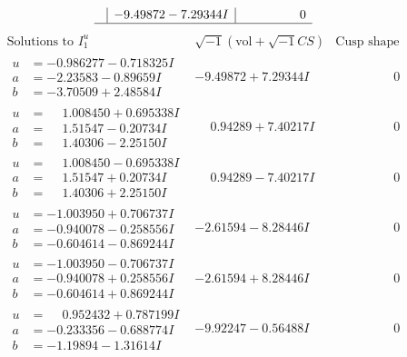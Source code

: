 \documentclass[1p]{elsarticle_modified}
\theoremstyle{definition}
\newcommand{\I}{\sqrt{-1}}
\begin{document}
$$\begin{array}{c|c|c}
 & -9.49872 - 7.29344 I & \phantom{-0.000000 } 0\\
 \hline 
 \end{array}$$\newpage$$\begin{array}{c|c|c}  
\text{Solutions to }I^u_{1}& \I (\text{vol} + \sqrt{-1}CS) & \text{Cusp shape}\\
 \hline 
\begin{aligned}
u &= -0.986277 - 0.718325 I \\
a &= -2.23583 - 0.89659 I \\
b &= -3.70509 + 2.48584 I\end{aligned}
 & -9.49872 + 7.29344 I & \phantom{-0.000000 } 0 \\ \hline\begin{aligned}
u &= \phantom{-}1.008450 + 0.695338 I \\
a &= \phantom{-}1.51547 - 0.20734 I \\
b &= \phantom{-}1.40306 - 2.25150 I\end{aligned}
 & \phantom{-}0.94289 + 7.40217 I & \phantom{-0.000000 } 0 \\ \hline\begin{aligned}
u &= \phantom{-}1.008450 - 0.695338 I \\
a &= \phantom{-}1.51547 + 0.20734 I \\
b &= \phantom{-}1.40306 + 2.25150 I\end{aligned}
 & \phantom{-}0.94289 - 7.40217 I & \phantom{-0.000000 } 0 \\ \hline\begin{aligned}
u &= -1.003950 + 0.706737 I \\
a &= -0.940078 - 0.258556 I \\
b &= -0.604614 - 0.869244 I\end{aligned}
 & -2.61594 - 8.28446 I & \phantom{-0.000000 } 0 \\ \hline\begin{aligned}
u &= -1.003950 - 0.706737 I \\
a &= -0.940078 + 0.258556 I \\
b &= -0.604614 + 0.869244 I\end{aligned}
 & -2.61594 + 8.28446 I & \phantom{-0.000000 } 0 \\ \hline\begin{aligned}
u &= \phantom{-}0.952432 + 0.787199 I \\
a &= -0.233356 - 0.688774 I \\
b &= -1.19894 - 1.31614 I\end{aligned}
 & -9.92247 - 0.56488 I & \phantom{-0.000000 } 0 \\ \hline\begin{aligned}

\end{aligned}
\end{array}$$
\end{document}
